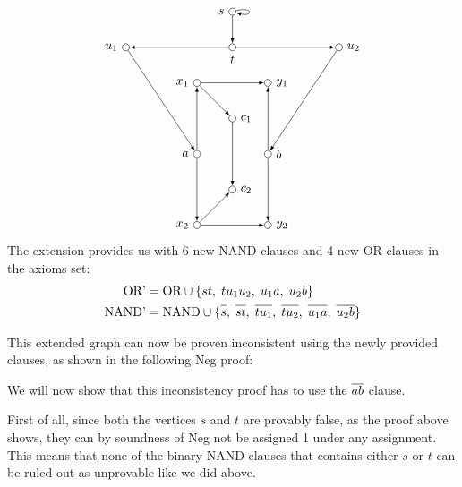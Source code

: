 \[
  \begin{tikzpicture}
    [
    point/.style={circle,draw,inner sep=0pt,minimum size=2mm},
    collection/.style={thick,rectangle,draw,inner sep=0pt,minimum height=14mm, minimum width= 9mm}
    ]
    \node (a) at (0,2) [point,label=left:$a$] {};
    \node (x1) at (0,4) [point,label=left:$x_1$] {};
    \node (x2) at (0,0) [point,label=left:$x_2$] {};
    \node (b) at (2,2) [point,label=right:$b$] {};
    \node (y1) at (2,4) [point,label=right:$y_1$] {};
    \node (y2) at (2,0) [point,label=right:$y_2$] {};
    \node (c1) at (1,3) [point,label=right:$c_1$] {};
    \node (c2) at (1,1) [point,label=right:$c_2$] {};
    \node (s) at (1,6) [point,label=left:$s$] {};
    \node (t) at (1,5) [point,label=below:$t$] {};
    \node (u1) at (-2,5) [point,label=left:$u_1$] {};
    \node (u2) at (4,5) [point,label=right:$u_2$] {};
    \draw [-latex] (a) to (x1);
    \draw [-latex] (a) to (x2);
    \draw [-latex] (b) to (y1);
    \draw [-latex] (b) to (y2);
    \draw [-latex] (x1) to (y1);
    \draw [-latex] (x1) to (c1);
    \draw [-latex] (x2) to (y2);
    \draw [-latex] (x2) to (c2);
    \draw [-latex] (c1) to (c2);
    \draw [-latex,loop right] (s) to (s);
    \draw [-latex] (s) to (t);
    \draw [-latex] (t) to (u1);
    \draw [-latex] (t) to (u2);
    \draw [-latex] (u1) to (a);
    \draw [-latex] (u2) to (b);
  \end{tikzpicture}
\]
The extension provides us with 6 new NAND-clauses and 4 new OR-clauses in the axioms set:
\begin{align}
  \text{OR'} &= \text{OR} \cup \{st,\; tu_1u_2,\; u_1a,\; u_2b \}\\
  \text{NAND'} &= \text{NAND} \cup \{\ol{s},\; \ol{st},\; \ol{tu_1},\; \ol{tu_2},\; \ol{u_1a},\; \ol{u_2b} \}
\end{align}

This extended graph can now be proven inconsistent using the newly provided clauses, as shown in the following Neg proof:
\begin{prooftree*}
  \Hypo{\dots}
\end{prooftree*}

We will now show that this inconsistency proof has to use the $\ol{ab}$ clause.

First of all, since both the vertices $s$ and $t$ are provably false, as the proof above shows, they can by soundness of Neg not be assigned 1 under any assignment.
This means that none of the binary NAND-clauses that contains either $s$ or $t$ can be ruled out as unprovable like we did above.
